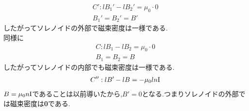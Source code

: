 \documentclass{jsarticle}
\begin{document}
\begin{eqnarray*}
C': lB_1'-lB_2'=\mu_0 \cdot 0 \\
B_1'=B_2'=B'
\end{eqnarray*}
したがってソレノイドの外部で磁束密度は一様である.　\\
同様に
\begin{eqnarray*}
C: lB_1-lB_2=\mu_0 \cdot 0 \\
B_1=B_2=B
\end{eqnarray*}
したがってソレノイドの内部でも磁束密度は一様である. \\
\begin{eqnarray*}
C'':lB'-lB=-\mu_0 l n {\rm I} \\
\end{eqnarray*}
$B=\mu_0n{\rm I}$であることは以前導いたから,$B'=0$となる.つまりソレノイドの外部では磁束密度は{\bf 0}である.
\end{document}
